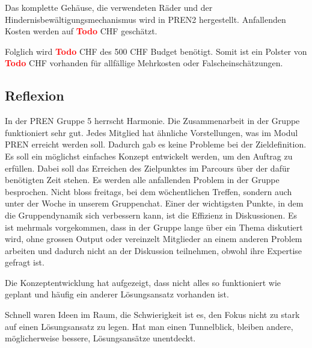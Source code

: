 \documentclass[../main.tex]{subfiles}
\begin{document}
Das komplette Gehäuse, die verwendeten Räder und der Hindernisbewältigungsmechanismus wird in PREN2 hergestellt. Anfallenden Kosten werden auf \textcolor{red}{\textbf{Todo}} CHF geschätzt.

Folglich wird \textcolor{red}{\textbf{Todo}} CHF des 500 CHF Budget benötigt. Somit ist ein Polster von \textcolor{red}{\textbf{Todo}} CHF vorhanden für allfällige Mehrkosten oder Falscheinschätzungen.

\subsection{Reflexion}

In der PREN Gruppe 5 herrscht Harmonie.
\newline
\newline
Die Zusammenarbeit in der Gruppe funktioniert sehr gut. Jedes Mitglied hat ähnliche Vorstellungen, was im Modul PREN erreicht werden soll. Dadurch gab es keine Probleme bei der Zieldefinition. Es soll ein möglichst einfaches Konzept entwickelt werden, um den Auftrag zu erfüllen. Dabei soll das Erreichen des Zielpunktes im Parcours über der dafür benötigten Zeit stehen. Es werden alle anfallenden Problem in der Gruppe besprochen. Nicht bloss freitags, bei dem wöchentlichen Treffen, sondern auch unter der Woche in unserem Gruppenchat. Einer der wichtigsten Punkte, in dem die Gruppendynamik sich verbessern kann, ist die Effizienz in Diskussionen. Es ist mehrmals vorgekommen, dass in der Gruppe lange über ein Thema diskutiert wird, ohne grossen Output oder vereinzelt Mitglieder an einem anderen Problem arbeiten und dadurch nicht an der Diskussion teilnehmen, obwohl ihre Expertise gefragt ist.

Die Konzeptentwicklung hat aufgezeigt, dass nicht alles so funktioniert wie geplant und häufig ein anderer Lösungsansatz vorhanden ist. 

Schnell waren Ideen im Raum, die Schwierigkeit ist es, den Fokus nicht zu stark auf einen Lösungsansatz zu legen. Hat man einen Tunnelblick, bleiben andere, möglicherweise bessere, Lösungsansätze unentdeckt. 
\end{document}
